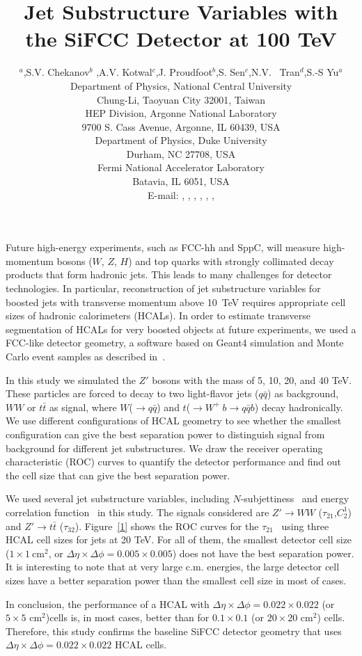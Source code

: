 \documentclass[a4paper]{PoS}
\title{Jet Substructure Variables with the SiFCC Detector at 100 TeV}
\author{\speaker{C.-H Yeh}$^a$,S.V. Chekanov$^b$ ,A.V. Kotwal$^{c}$,J. Proudfoot$^{b}$,S. Sen$^{c}$,N.V. ~Tran$^{d}$,S.-S Yu$^{a}$\\     
     \llap{$^a$}Department of Physics, National Central University\\
     Chung-Li, Taoyuan City 32001, Taiwan\\
     \llap{$^b$}HEP Division, Argonne National Laboratory\\
     9700 S. Cass Avenue, Argonne, IL 60439, USA\\
     \llap{$^c$}Department of Physics, Duke University\\
     Durham, NC 27708, USA\\
     \llap{$^d$}Fermi National Accelerator Laboratory\\
     Batavia, IL 6051, USA\\
     E-mail:  \email{a9510130375@gmail.com},
     \email{chekanov@anl.gov},
     \email{kotwal@phy.duke.edu},
     \email{proudfoot@anl.gov},
     \email{sourav.sen@duke.edu},
     \email{ntran@fnal.gov},
     \email{syu@phy.ncu.edu.tw}}
\begin{document}
Future high-energy experiments, such as FCC-hh and SppC, 
will measure high-momentum bosons ($W$, $Z$, $H$) and top quarks 
with strongly collimated decay products that form hadronic jets. This leads to many
challenges for detector technologies.  In particular, reconstruction of jet substructure  variables for boosted jets with transverse
momentum above 10~TeV
requires appropriate  cell sizes of hadronic
calorimeters  (HCALs). In order to estimate 
transverse segmentation  
of HCALs for very boosted objects at future experiments, 
we used a FCC-like detector geometry,
a software based on Geant4 simulation and Monte Carlo event samples as described in~\cite{Chekanov:2016ppq}.
 
In this study we simulated the $Z'$ bosons with the mass of 5, 10, 20, and 40 TeV. These particles are forced to decay to two light-flavor jets ($q\bar{q}$) as background, $W W$ or $t\bar{t}$ as signal, where $W$($\rightarrow q\bar{q}$) and $t$($ \rightarrow  W^+\>b \rightarrow q\bar{q} b$) decay hadronically. We use different configurations of HCAL geometry to see whether the smallest configuration can give the best separation power to distinguish signal from background for different jet substructures. We draw the receiver operating characteristic (ROC) curves to quantify the detector performance and find out the cell size that can give the best separation power.

We used several jet substructure variables, including $N$-subjettiness~\cite{Thaler:2010tr} and energy correlation function~\cite{Larkoski:2013eya} in this study. The signals considered are $Z'\rightarrow WW$ ($\tau_{21}$,$C_2^1$) and $Z' \rightarrow t\bar{t}$ ($\tau_{32}$). Figure~\ref{1} shows the ROC curves for the $\tau_{21}$~\cite{Thaler:2010tr} using three HCAL cell sizes for jets at 20 TeV. For all of them, the smallest detector cell size ($1\times1~\mathrm{cm}^2$, or $\Delta \eta \times \Delta \phi = 0.005\times0.005$) does not have the best separation power. It is interesting to note that at very large c.m. energies, the large detector cell sizes have a better separation power than the smallest cell size in most of cases. 

In conclusion, the  performance 
of a  HCAL with 
$\Delta \eta \times \Delta \phi = 0.022\times0.022$ (or $5\times5$ cm$^2$)cells is, in most cases,
better than for $0.1\times0.1$ (or $20\times20$ cm$^2$) cells.
Therefore, this study confirms the  baseline SiFCC detector geometry \cite{Chekanov:2016ppq}
that uses $\Delta \eta \times \Delta \phi = 0.022\times0.022$ HCAL cells.
\end{document}
